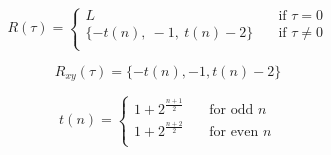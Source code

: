 		\begin{equation}
			\label{eq:autocorr-gold}
			R(\tau) = 
				\begin{cases}
					L    							& \quad \text{if } \tau = 0 \\
					\{ -t(n), \ -1, \ t(n) - 2  \} 	& \quad \text{if } \tau \neq 0 \\
				\end{cases}
		\end{equation}

		\begin{equation}
			\label{eq:corsscorr-gold}
			R_{xy}(\tau) = 	\{ -t(n), -1, t(n) - 2  \} 
		\end{equation}

		\begin{equation}
			\label{eq:gold-t(n)}
			t(n) = 
				\begin{cases}
					1 + 2^{\frac{n+1}{2}} & \quad \text{for odd } n \\
					1 + 2^{\frac{n+2}{2}} & \quad \text{for even } n \\
				\end{cases}
		\end{equation}

		

		




